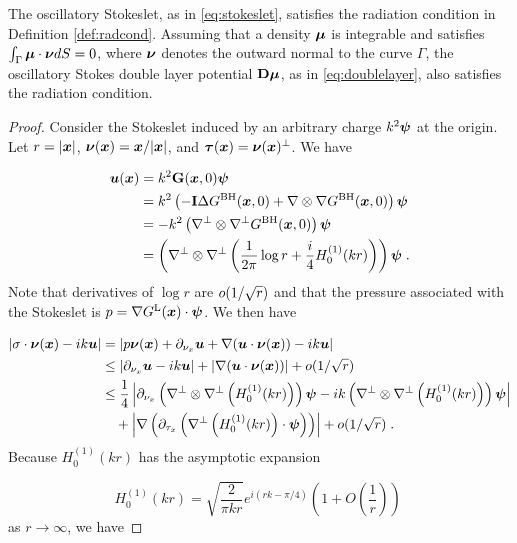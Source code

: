 \begin{proposition}
The oscillatory Stokeslet, as in \eqref{eq:stokeslet}, satisfies
the radiation condition in Definition \ref{def:radcond}.
Assuming that a density ${\boldsymbol \mu}$ is integrable and satisfies
$\int_\Gamma {\boldsymbol \mu}\cdot {\boldsymbol \nu} dS = 0$, where ${\boldsymbol \nu}$ denotes the
outward normal to the curve $\Gamma$, the oscillatory Stokes
double layer potential ${\bf D}{\boldsymbol \mu}$, as in \eqref{eq:doublelayer},
also satisfies the radiation condition.
\end{proposition}

\begin{proof}
Consider the Stokeslet induced by an arbitrary charge
$k^2 {\boldsymbol \psi}$ at the origin. Let $r = |{\boldsymbol x}|$,
${\boldsymbol \nu}({\boldsymbol x}) = {\boldsymbol x}/|{\boldsymbol x}|$, and ${\boldsymbol \tau}({\boldsymbol x}) = {\boldsymbol \nu}({\boldsymbol x})^\perp$. We have

\begin{align}
{\boldsymbol u} ({\boldsymbol x}) &= k^2 {\bf G}({\boldsymbol x},0) {\boldsymbol \psi} \\
&= k^2 \left (-{\bf I} \Delta G^{\textrm{BH}}({\boldsymbol x},0)
+ \nabla \otimes \nabla G^{\textrm{BH}}({\boldsymbol x},0)\right ) {\boldsymbol \psi} \\
&= -k^2 \left (\nabla^\perp \otimes \nabla^\perp G^{\textrm{BH}}({\boldsymbol x},0) \right) {\boldsymbol \psi} \\
&= \left(\nabla^\perp \otimes \nabla^\perp \left ( \frac{1}{2\pi}
\log r + \frac{i}{4} H_0^{(1)} (kr) \right ) \right){\boldsymbol \psi} \; .
\end{align}
Note that derivatives of $\log r$ are $o (1/\sqrt{r})$
and that the pressure associated with the Stokeslet is
$p = \nabla G^{\textrm{L}}({\boldsymbol x}) \cdot {\boldsymbol \psi}$. We then have

\begin{align}
\left | \sigma \cdot {\boldsymbol \nu}({\boldsymbol x}) - i k {\boldsymbol u} \right | &=
\left | p {\boldsymbol \nu}({\boldsymbol x}) + \partial_{{\nu_x}} {\boldsymbol u} + \nabla ({\boldsymbol u} \cdot {\boldsymbol \nu}({\boldsymbol x}))
- ik {\boldsymbol u} \right | \\
&\leq \left | \partial_{{\nu_x}} {\boldsymbol u} - ik{\boldsymbol u} \right | + \left | \nabla({\boldsymbol u} \cdot {\boldsymbol \nu}({\boldsymbol x})) \right |
+ o (1/\sqrt{r}) \\
&\leq \frac{1}{4} \left | \partial_{{\nu_x}} \left(\nabla^\perp \otimes
\nabla^\perp \left (H_0^{(1)} (kr) \right ) \right){\boldsymbol \psi}
- i k \left(\nabla^\perp \otimes \nabla^\perp
\left (H_0^{(1)} (kr) \right ) \right){\boldsymbol \psi} \right | \\
& \quad + \left | \nabla \left( \partial_{\tau_x} \left ( 
\nabla^\perp \left (H_0^{(1)} (kr) \right ) \cdot {\boldsymbol \psi}  \right )
\right) \right | + o (1/\sqrt{r}) \; .
\end{align}
Because $H_0^{(1)}(kr)$ has the asymptotic expansion 

\begin{equation}
H_0^{(1)}(kr) = \sqrt{\frac{2}{\pi k r}} e^{i(rk-\pi/4)} \left ( 1 + O\left (
\frac{1}{r} \right ) \right ) \;
\end{equation}
as $r\to \infty$, we have


\end{proof}
